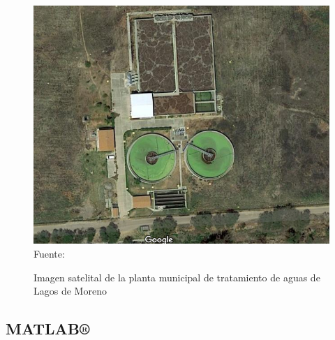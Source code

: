 \begin{figure}[H]
	\centering
	\includegraphics[scale=0.5]{../Images/PTAR_Lagos.png}
	\\\small{Fuente: \cite{Maps}}
	\caption{Imagen satelital de la planta municipal de tratamiento de aguas de Lagos de Moreno}\label{fig:lgsptar}
\end{figure}
\subsection{MATLAB®}

